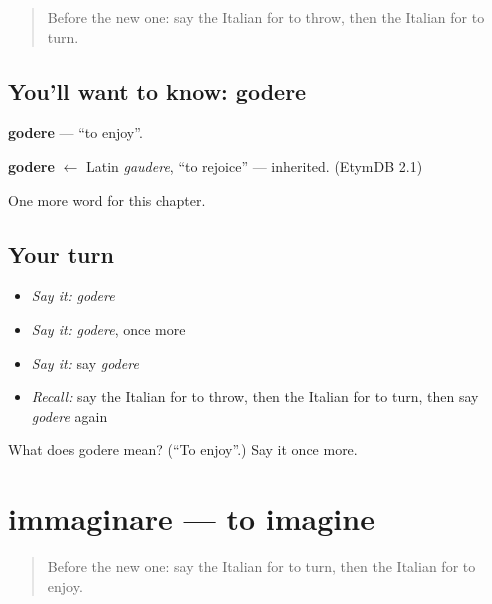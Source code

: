 \label{lesson:IT-C209-godere}



\begin{quote}
Before the new one: say the Italian for to throw, then the Italian for to turn.
\end{quote}

\subsection*{You'll want to know: godere}
\textbf{godere} — \textquotedblleft{}to enjoy\textquotedblright{}.

\begin{cousinweb}
\textbf{godere} $\leftarrow$ Latin \emph{gaudere}, \textquotedblleft{}to rejoice\textquotedblright{} — inherited. (EtymDB 2.1)
\end{cousinweb}

\begin{grammarlens}[title={What you've built}]
One more word for this chapter.
\end{grammarlens}

\subsection*{Your turn}
\begin{itemize}
\raggedright
  \item \emph{Say it:} \emph{godere}
  \item \emph{Say it:} \emph{godere}, once more
  \item \emph{Say it:} say \emph{godere}
  \item \emph{Recall:} say the Italian for to throw, then the Italian for to turn, then say \emph{godere} again
\end{itemize}

\begin{tcolorbox}[breakable,colback=teal!4,colframe=teal!35!black,title={Before you move on}]
What does godere mean? (\textquotedblleft{}To enjoy\textquotedblright{}.) Say it once more.
\end{tcolorbox}
\section[immaginare]{immaginare — to imagine}

\label{lesson:IT-C209-immaginare}



\begin{quote}
Before the new one: say the Italian for to turn, then the Italian for to enjoy.
\end{quote}


